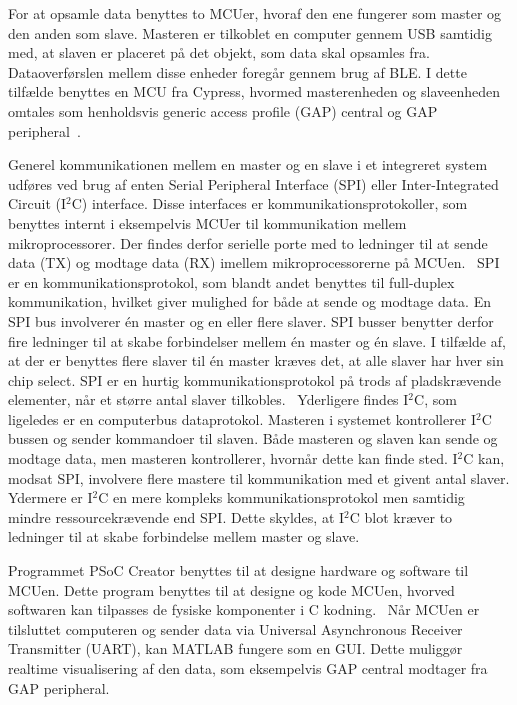 For at opsamle data benyttes to MCUer, hvoraf den ene fungerer som master og den anden som slave. Masteren er tilkoblet en computer gennem USB samtidig med, at slaven er placeret på det objekt, som data skal opsamles fra. Dataoverførslen mellem disse enheder foregår gennem brug af BLE. I dette tilfælde benyttes en MCU fra Cypress, hvormed masterenheden og slaveenheden omtales som henholdsvis generic access profile (GAP) central og GAP peripheral~\citep{Luthra2015}.

Generel kommunikationen mellem en master og en slave i et integreret system udføres ved brug af enten Serial Peripheral Interface (SPI) eller Inter-Integrated Circuit (I$^{2}$C) interface. Disse interfaces er kommunikationsprotokoller, som benyttes internt i eksempelvis MCUer til kommunikation mellem mikroprocessorer. Der findes derfor serielle porte med to ledninger til at sende data (TX) og modtage data (RX) imellem mikroprocessorerne på MCUen.~\citep{Semiconductor2016} \newline
SPI er en kommunikationsprotokol, som blandt andet benyttes til full-duplex kommunikation, hvilket giver mulighed for både at sende og modtage data. En SPI bus involverer én master og en eller flere slaver. SPI busser benytter derfor fire ledninger til at skabe forbindelser mellem én master og én slave. I tilfælde af, at der er benyttes flere slaver til én master kræves det, at alle slaver har hver sin chip select. SPI er en hurtig kommunikationsprotokol på trods af pladskrævende elementer, når et større antal slaver tilkobles.~\citep{Semiconductor2016,Sparkfun2016} \newline
Yderligere findes I$^{2}$C, som ligeledes er en computerbus dataprotokol. Masteren i systemet kontrollerer I$^{2}$C bussen og sender kommandoer til slaven. Både masteren og slaven kan sende og modtage data, men masteren kontrollerer, hvornår dette kan finde sted. I$^{2}$C kan, modsat SPI, involvere flere mastere til kommunikation med et givent antal slaver. Ydermere er I$^{2}$C en mere kompleks kommunikationsprotokol men samtidig mindre ressourcekrævende end SPI. Dette skyldes, at I$^{2}$C blot kræver to ledninger til at skabe forbindelse mellem master og slave.~\citep{Semiconductor2016,Sparkfun2016} 

Programmet PSoC Creator benyttes til at designe hardware og software til MCUen. Dette program benyttes til at designe og kode MCUen, hvorved softwaren kan tilpasses de fysiske komponenter i C kodning.~\citep{Semiconductor2016} Når MCUen er tilsluttet computeren og sender data via Universal Asynchronous Receiver Transmitter (UART), kan MATLAB fungere som en GUI. Dette muliggør realtime visualisering af den data, som eksempelvis GAP central modtager fra GAP peripheral.~\citep{Semiconductor2016,Sparkfun2016}

